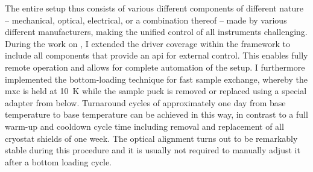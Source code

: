 The entire setup thus consists of various different components of different nature -- mechanical, optical, electrical, or a combination thereof -- made by various different manufacturers, making the unified control of all instruments challenging.
During the work on \thethesis, I extended the \python driver coverage within the \qcodes framework to include all components that provide an \gls{api} for external control.
This enables fully remote operation and allows for complete automation of the setup.
I furthermore implemented the bottom-loading technique for fast sample exchange, whereby the \gls{mxc} is held at \qty{10}{\kelvin} while the sample puck is removed or replaced using a special adapter from below.
Turnaround cycles of approximately one day from base temperature to base temperature can be achieved in this way, in contrast to a full warm-up and cooldown cycle time including removal and replacement of all cryostat shields of one week.
The optical alignment turns out to be remarkably stable during this procedure and it is usually not required to manually adjust it after a bottom loading cycle.

